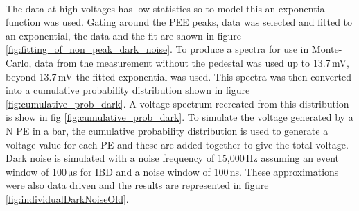 \\The data at high voltages has low statistics so to model this an exponential function was used. Gating around the PEE peaks, data was selected and fitted to an exponential, the data and the fit are shown in figure \ref{fig:fitting_of_non_peak_dark_noise}. To produce a spectra for use in Monte-Carlo, data from the measurement without the pedestal was used up to 13.7\,mV, beyond 13.7\,mV the fitted exponential was used. This spectra was then converted into a cumulative probability distribution shown in figure \ref{fig:cumulative_prob_dark}. A voltage spectrum recreated from this distribution is show in fig \ref{fig:cumulative_prob_dark}. To simulate the voltage generated by a N PE in a bar, the cumulative probability distribution is used to generate a voltage value for each PE and these are added together to give the total voltage. Dark noise is simulated with a noise frequency of 15,000\,Hz assuming an event window of 100\,$\mathrm{\mu}$s for IBD and a noise window of 100\,ns. These approximations were also data driven and the results are represented in figure \ref{fig:individualDarkNoiseOld}.
